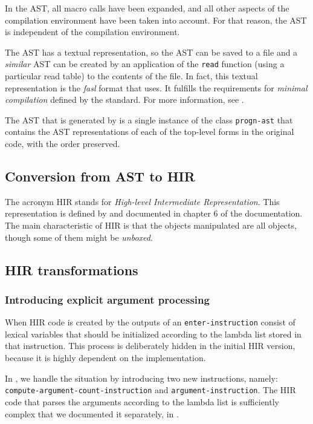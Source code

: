 In the AST, all macro calls have been expanded, and all other aspects
of the compilation environment have been taken into account.  For that
reason, the AST is independent of the compilation environment.

The AST has a textual representation, so the AST can be saved to a
file and a \emph{similar} AST can be created by an application of the
\texttt{read} function (using a particular read table) to the contents
of the file.  In fact, this textual representation is the \emph{fasl}
format that \sysname{} uses.  It fulfills the requirements for
\emph{minimal compilation} defined by the \commonlisp{} standard.
For more information, see .

The AST that is generated by \cleavir{} is a single instance of the
class \texttt{progn-ast} that contains the AST representations of each
of the top-level forms in the original code, with the order preserved.

\subsection{Conversion from AST to HIR}

The acronym HIR stands for \emph{High-level Intermediate
  Representation}.  This representation is defined by \cleavir{} and
documented in chapter 6 of the \cleavir{} documentation.
The main characteristic of HIR is that the objects manipulated are all
\commonlisp{} objects, though some of them might be \emph{unboxed}.

\subsection{HIR transformations}

\subsubsection{Introducing explicit argument processing}

When HIR code is created by \cleavir{} the outputs of an
\texttt{enter-instruction} consist of lexical variables that should be
initialized according to the lambda list stored in that instruction.
This process is deliberately hidden in the initial HIR version,
because it is highly dependent on the implementation.

In \sysname{}, we handle the situation by introducing two new
instructions, namely: \texttt{compute-argument-count-instruction} and
\texttt{argument-instruction}.  The HIR code that parses the arguments
according to the lambda list is sufficiently complex that we
documented it separately, in .

